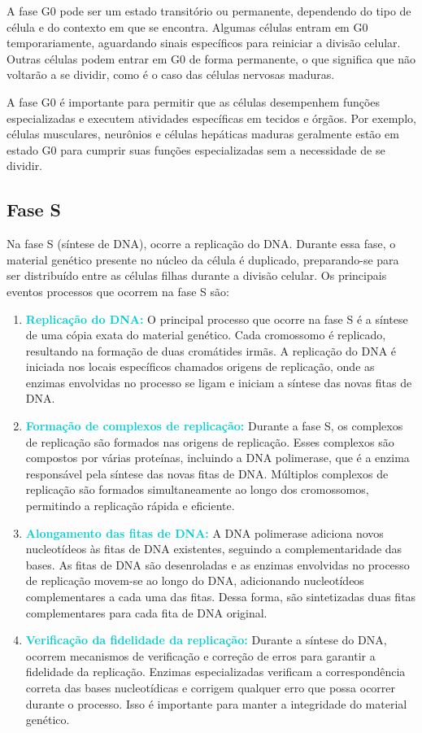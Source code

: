 \documentclass[11pt,a4paper]{article}
\newcounter{exemplo}
\begin{document}
	A fase G0 pode ser um estado transitório ou permanente, dependendo do tipo de célula e do contexto em que se encontra. Algumas células entram em G0 temporariamente, aguardando sinais específicos para reiniciar a divisão celular. Outras células podem entrar em G0 de forma permanente, o que significa que não voltarão a se dividir, como é o caso das células nervosas maduras.

	A fase G0 é importante para permitir que as células desempenhem funções especializadas e executem atividades específicas em tecidos e órgãos. Por exemplo, células musculares, neurônios e células hepáticas maduras geralmente estão em estado G0 para cumprir suas funções especializadas sem a necessidade de se dividir.

	
	\subsection{Fase S}

	Na fase S (síntese de DNA), ocorre a replicação do DNA. Durante essa fase, o material genético presente no núcleo da célula é duplicado, preparando-se para ser distribuído entre as células filhas durante a divisão celular. Os principais eventos processos que ocorrem na fase S são:

	\begin{enumerate}
		\item \textcolor{DarkTurquoise}{\textbf{Replicação do DNA:}} O principal processo que ocorre na fase S é a síntese de uma cópia exata do material genético. Cada cromossomo é replicado, resultando na formação de duas cromátides irmãs. A replicação do DNA é iniciada nos locais específicos chamados origens de replicação, onde as enzimas envolvidas no processo se ligam e iniciam a síntese das novas fitas de DNA. 
		\item \textcolor{DarkTurquoise}{\textbf{Formação de complexos de replicação:}} Durante a fase S, os complexos de replicação são formados nas origens de replicação. Esses complexos são compostos por várias proteínas, incluindo a DNA polimerase, que é a enzima responsável pela síntese das novas fitas de DNA. Múltiplos complexos de replicação são formados simultaneamente ao longo dos cromossomos, permitindo a replicação rápida e eficiente.
		\item \textcolor{DarkTurquoise}{\textbf{Alongamento das fitas de DNA:}} A DNA polimerase adiciona novos nucleotídeos às fitas de DNA existentes, seguindo a complementaridade das bases. As fitas de DNA são desenroladas e as enzimas envolvidas no processo de replicação movem-se ao longo do DNA, adicionando nucleotídeos complementares a cada uma das fitas. Dessa forma, são sintetizadas duas fitas complementares para cada fita de DNA original.
		\item \textcolor{DarkTurquoise}{\textbf{Verificação da fidelidade da replicação:}}  Durante a síntese do DNA, ocorrem mecanismos de verificação e correção de erros para garantir a fidelidade da replicação. Enzimas especializadas verificam a correspondência correta das bases nucleotídicas e corrigem qualquer erro que possa ocorrer durante o processo. Isso é importante para manter a integridade do material genético.
	\end{enumerate}
\end{document}
